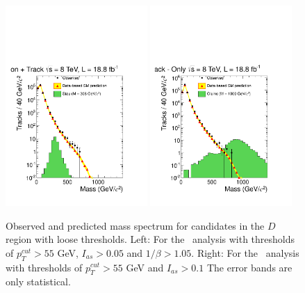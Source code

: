 \begin{figure}
 \begin{center}
  \includegraphics[clip=false, trim=0.0cm 0cm 0.0cm 0cm, width=0.48\textwidth]{figures/tkmu/RescaleNoRatio_Mass_8TeV_LooseNoSMMC}
  \includegraphics[clip=false, trim=0.0cm 0cm 0.0cm 0cm, width=0.48\textwidth]{figures/tkonly/RescaleNoRatio_Mass_8TeV_LooseNoSMMC}
 \end{center}
 \caption[Observed and predicted mass spectrum for candidates in the signal region with loose thresholds in the \tktof\ and \tkonly\ analyses.]
{Observed and predicted mass spectrum for candidates in the $D$ region with loose thresholds.
Left: For the \tktof\ analysis with thresholds of $p_T^{cut}>55$ GeV, $I_{as}>0.05$ and $1/\beta>1.05$.
Right: For the \tkonly\ analysis with thresholds of $p_T^{cut}>55$ GeV and $I_{as}>0.1$
The error bands are only statistical.}
\label{fig:MassDistribution}
\end{figure}

